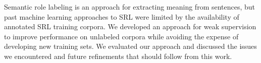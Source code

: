 Semantic role labeling is an approach for extracting meaning from sentences, but past machine learning approaches to SRL were limited by the availability of annotated SRL training corpora.  We developed an approach for weak supervision to improve performance on unlabeled corpora while avoiding the expense of developing new training sets.  We evaluated our approach and discussed the issues we encountered and future refinements that should follow from this work.

